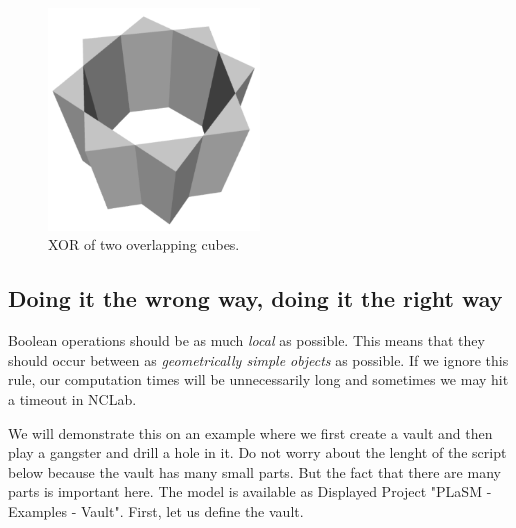 \documentclass{article}
\begin{document}
\newpage

\begin{figure}[!ht]
\begin{center}
\includegraphics[width=0.5\textwidth]{img/xor-1.png}
\end{center}
\vspace{-2mm}
\caption{XOR of two overlapping cubes.}
\label{fig:xor-1}
\end{figure}
\noindent

\subsection{Doing it the wrong way, doing it the right way}

Boolean operations should be as much {\em local} as possible. This means
that they should occur between as {\em geometrically simple objects} as possible. If we 
ignore this rule, our computation times will be unnecessarily long and sometimes
we may hit a timeout in NCLab. 

We will demonstrate this on an example where we first create a vault and then play 
a gangster and drill a hole in it. Do not worry about the lenght of the script below  because
the vault has many small parts. But the fact that there are many parts is important here.
The model is available as Displayed Project "PLaSM - Examples - Vault". First, let us define the vault. 
\end{document}
